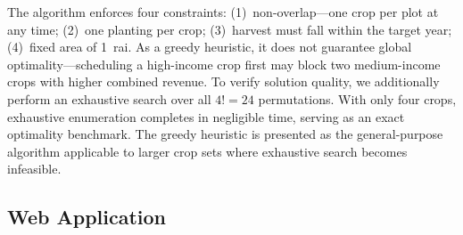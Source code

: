 \documentclass[conference]{IEEEtran}
\begin{document}
The algorithm enforces four constraints: (1)~non-overlap---one crop per plot at any time; (2)~one planting per crop; (3)~harvest must fall within the target year; (4)~fixed area of 1~rai. As a greedy heuristic, it does not guarantee global optimality---scheduling a high-income crop first may block two medium-income crops with higher combined revenue. To verify solution quality, we additionally perform an exhaustive search over all $4! = 24$ permutations. With only four crops, exhaustive enumeration completes in negligible time, serving as an exact optimality benchmark. The greedy heuristic is presented as the general-purpose algorithm applicable to larger crop sets where exhaustive search becomes infeasible.

\subsection{Web Application}
\end{document}
